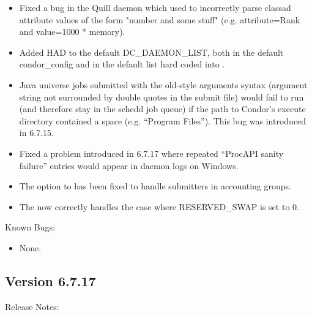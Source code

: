 \begin{itemize}
\item Fixed a bug in the Quill daemon which used to incorrectly parse 
classad attribute values of the form "number and some stuff" (e.g. 
attribute=Rank and value=1000 * memory). 

\item Added HAD to the default DC\_DAEMON\_LIST, both in the default
condor\_config and in the default list hard coded into .

\item Java universe jobs submitted with the old-style arguments syntax
(argument string not surrounded by double quotes in the submit file)
would fail to run (and therefore stay in the schedd job queue) if the
path to Condor's execute directory contained a space (e.g. ``Program
Files'').  This bug was introduced in 6.7.15.

\item Fixed a problem introduced in 6.7.17 where repeated ``ProcAPI
sanity failure'' entries would appear in daemon logs on Windows.

\item The  option to  has been fixed to
handle submitters in accounting groups.

\item The  now correctly handles the case where
RESERVED\_SWAP is set to 0.

\end{itemize}

\noindent Known Bugs:

\begin{itemize}

\item None.

\end{itemize}

\subsection*{\label{sec:New-6-7.17}Version 6.7.17}

\noindent Release Notes:

